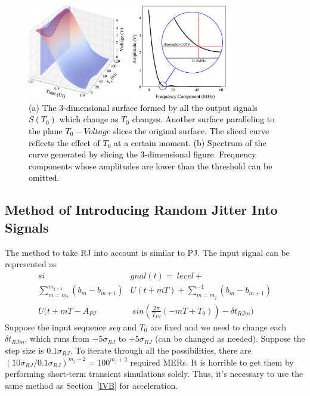 \documentclass[conference]{IEEEtran}
\begin{document}
\begin{figure}[t]
\centerline{\includegraphics[width=250pt]{Fig8-9.png}}
\caption{\textcolor{black}{(a) The 3-dimensional surface formed by all the output signals $S(T_0)$ which change as $T_0$ changes. Another surface paralleling to the plane $T_0-Voltage$ slices the original surface. The sliced curve reflects the effect of $T_0$ at a certain moment. (b) Spectrum of the curve generated by slicing the 3-dimensional figure. Frequency components whose amplitudes are lower than the threshold can be omitted.}}
\label{Fig8-9}
\end{figure}

\subsection{Method of \textcolor{black}{Introducing} Random Jitter Into Signals}\label{IVC}

The method to take RJ into account is similar to PJ. The input signal can be represented as
\begin{equation}
\begin{split}
si&gnal(t)=\ level+\\
\sum_{m=m_b}^{m_{j+1}}(b_m-b_{m+1})&U(t+mT)+\sum_{m=m_j}^{-1}(b_m-b_{m+1})\\
U(t+mT-A_{PJ}&\ sin(\frac{2\pi}{T_{PJ}}(-mT+T_0))-\delta t_{RJ m})
\end{split}
\label{eq10}
\end{equation}
Suppose \textcolor{black}{the input sequence $seq$ and} $T_0$ are fixed and we need to change each $\delta t_{RJ m}$, which runs from $-5\sigma_{RJ}$ to $+5\sigma_{RJ}$ (can be changed as needed). Suppose the step size is $0.1\sigma_{RJ}$. To iterate through all the possibilities,
\color{black}
there are $(10\sigma_{RJ}/0.1\sigma_{RJ})^{m_j+2}=100^{m_j+2}$ required MERs. It is horrible to get them by performing short-term transient simulations solely. Thus, it's necessary to use the same method as Section~\ref{IVB} for acceleration.
\color{black}
\end{document}

